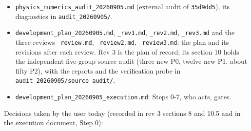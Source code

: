 \documentclass[english,a4paper]{my_memo}
\providecommand{\tightlist}{\setlength{\itemsep}{0pt}\setlength{\parskip}{0pt}}
\begin{document}
\begin{itemize}
\tightlist
\item
  \texttt{physics\_numerics\_audit\_20260905.md} (external audit of \texttt{35d9dd5}), its
  diagnostics in \texttt{audit\_20260905/}.
\item
  \texttt{development\_plan\_20260905.md}, \texttt{\_rev1.md}, \texttt{\_rev2.md}, \texttt{\_rev3.md} and the
  three reviews \texttt{\_review.md}, \texttt{\_review2.md}, \texttt{\_review3.md}: the plan and its
  revisions after each review. Rev 3 is the plan of record; its section 10
  holds the independent five-group source audit (three new P0, twelve new P1,
  about fifty P2), with the reports and the verification probe in
  \texttt{audit\_20260905/source\_audit/}.
\item
  \texttt{development\_plan\_20260905\_execution.md}: Steps 0-7, who acts, gates.
\end{itemize}

Decisions taken by the user today (recorded in rev 3 sections 8 and 10.5
and in the execution document, Step 0):
\end{document}
